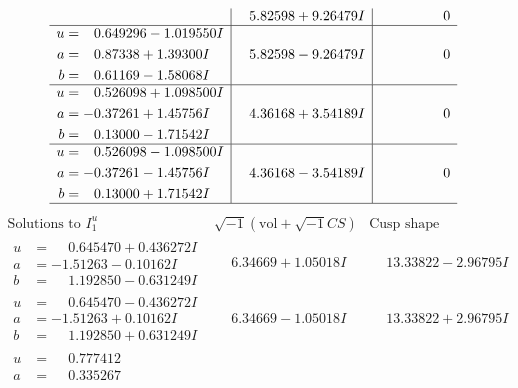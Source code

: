\documentclass[1p]{elsarticle_modified}
\theoremstyle{definition}
\newcommand{\I}{\sqrt{-1}}
\begin{document}
$$\begin{array}{c|c|c}
 & \phantom{-}5.82598 + 9.26479 I & \phantom{-0.000000 } 0 \\ \hline\begin{aligned}
u &= \phantom{-}0.649296 - 1.019550 I \\
a &= \phantom{-}0.87338 + 1.39300 I \\
b &= \phantom{-}0.61169 - 1.58068 I\end{aligned}
 & \phantom{-}5.82598 - 9.26479 I & \phantom{-0.000000 } 0 \\ \hline\begin{aligned}
u &= \phantom{-}0.526098 + 1.098500 I \\
a &= -0.37261 + 1.45756 I \\
b &= \phantom{-}0.13000 - 1.71542 I\end{aligned}
 & \phantom{-}4.36168 + 3.54189 I & \phantom{-0.000000 } 0 \\ \hline\begin{aligned}
u &= \phantom{-}0.526098 - 1.098500 I \\
a &= -0.37261 - 1.45756 I \\
b &= \phantom{-}0.13000 + 1.71542 I\end{aligned}
 & \phantom{-}4.36168 - 3.54189 I & \phantom{-0.000000 } 0\\
 \hline 
 \end{array}$$\newpage$$\begin{array}{c|c|c}  
\text{Solutions to }I^u_{1}& \I (\text{vol} + \sqrt{-1}CS) & \text{Cusp shape}\\
 \hline 
\begin{aligned}
u &= \phantom{-}0.645470 + 0.436272 I \\
a &= -1.51263 - 0.10162 I \\
b &= \phantom{-}1.192850 - 0.631249 I\end{aligned}
 & \phantom{-}6.34669 + 1.05018 I & \phantom{-}13.33822 - 2.96795 I \\ \hline\begin{aligned}
u &= \phantom{-}0.645470 - 0.436272 I \\
a &= -1.51263 + 0.10162 I \\
b &= \phantom{-}1.192850 + 0.631249 I\end{aligned}
 & \phantom{-}6.34669 - 1.05018 I & \phantom{-}13.33822 + 2.96795 I \\ \hline\begin{aligned}
u &= \phantom{-}0.777412\phantom{ +0.000000I} \\
a &= \phantom{-}0.335267\phantom{ +0.000000I} \\

\end{aligned}
\end{array}$$
\end{document}
